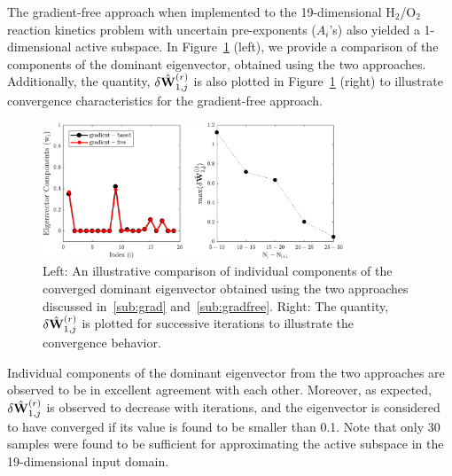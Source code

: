 The gradient-free approach when implemented to the 19-dimensional H$_2$/O$_2$ reaction kinetics problem
with uncertain pre-exponents ($A_i$'s) also yielded a 1-dimensional active subspace. In Figure~\ref{fig:comp} (left),
we provide a comparison of the components of the dominant eigenvector, obtained using the two approaches.
Additionally, the quantity, $\delta \hat{\mathbf{{W}}}_{1,j}^{(r)}$ is also plotted in
Figure~\ref{fig:comp} (right) to illustrate convergence characteristics for the gradient-free approach.
%
\begin{figure}[htbp]
 \begin{center}
  \includegraphics[width=0.8\textwidth]{./Figures/eigv6}
\caption{Left: An illustrative comparison of individual components of the converged dominant eigenvector obtained
using the two approaches discussed in~\ref{sub:grad} and~\ref{sub:gradfree}. Right: The quantity,  $\delta \hat{\mathbf{{W}}}_{1,j}^{(r)}$
is plotted for successive iterations to illustrate the convergence behavior.}
\label{fig:comp}
\end{center}
\end{figure}
%
Individual components of the dominant eigenvector from the two approaches are observed to be in excellent
agreement with each other. Moreover, as expected,  $\delta \hat{\mathbf{{W}}}_{1,j}^{(r)}$ is observed to decrease with iterations, and
the eigenvector is considered to have converged if its value is found to be smaller than 0.1. Note that only 30 samples
were found to be sufficient for approximating the active subspace in the 19-dimensional input domain. 

